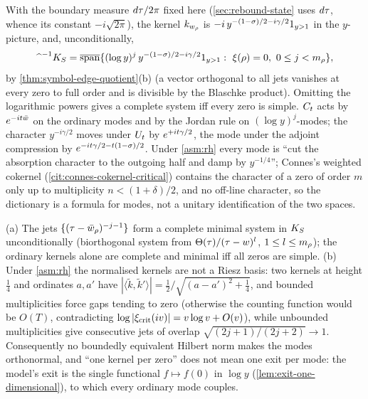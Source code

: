 \begin{theorem}
\label{thm:model-space-jets}
With the boundary measure $d\tau/2\pi$ fixed here (\cref{sec:rebound-state} uses $d\tau$, whence its constant $-i\sqrt{2\pi}$), the kernel $k_{w_\rho}$ is $-i\,y^{-(1-\sigma)/2 - i\gamma/2}1_{y>1}$ in the $y$-picture, and, unconditionally,
\[
\widehat{\phantom{x}}^{-1}K_S = \overline{\mathrm{span}}\{(\log y)^j\,y^{-(1-\sigma)/2-i\gamma/2}1_{y>1}:\ \xi(\rho) = 0,\ 0\le j<m_\rho\},
\]
by \cref{thm:symbol-edge-quotient}(b) (a vector orthogonal to all jets vanishes at every zero to full order and is
divisible by the Blaschke product). Omitting the logarithmic powers gives a complete system iff every zero is simple.
$C_t$ acts by $e^{-it\bar w}$ on the ordinary modes and by the Jordan rule on $(\log y)^j$-modes; the character
$y^{-i\gamma/2}$ moves under $U_t$ by $e^{+it\gamma/2}$, the mode under the adjoint compression by
$e^{-it\gamma/2-t(1-\sigma)/2}$. Under \cref{asm:rh} every mode is ``cut the absorption character to the outgoing
half and damp by $y^{-1/4}$''; Connes's weighted cokernel (\cref{cit:connes-cokernel-critical}) contains the
character of a zero of order $m$ only up to multiplicity $n<(1+\delta)/2$, and no off-line character, so the
dictionary is a formula for modes, not a unitary identification of the two spaces.
\end{theorem}

\begin{proposition}
\label{prop:kernels-not-riesz}
(a) The jets $\{(\tau-\bar w_\rho)^{-j-1}\}$ form a complete minimal system in $K_S$ unconditionally (biorthogonal
system from $\Theta(\tau)/(\tau-w)^l$, $1\le l\le m_\rho$); the ordinary kernels alone are complete and minimal
iff all zeros are simple. (b) Under \cref{asm:rh} the normalised kernels are not a Riesz basis: two kernels at
height $\tfrac14$ and ordinates $a,a'$ have $|\langle\tilde k,\tilde k'\rangle| = \tfrac12/\sqrt{(a-a')^2+\tfrac14}$, and
bounded multiplicities force gaps tending to zero (otherwise the counting function would be $O(T)$, contradicting
$\log|\xi_{\mathrm{crit}}(iv)| = v\log v + O(v)$), while unbounded multiplicities give consecutive jets of overlap
$\sqrt{(2j+1)/(2j+2)}\to1$. Consequently no boundedly equivalent Hilbert norm makes the modes orthonormal, and
``one kernel per zero'' does not mean one exit per mode: the model's exit is the single functional $f\mapsto f(0)$
in $\log y$ (\cref{lem:exit-one-dimensional}), to which every ordinary mode couples.
\end{proposition}

